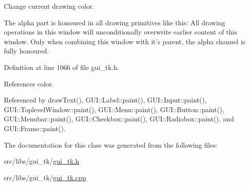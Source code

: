 Change current drawing color. 

The alpha part is honoured in all drawing primitives like this\-: All drawing operations in this window will unconditionally overwrite earlier content of this window. Only when combining this window with it's parent, the alpha channel is fully honoured. 

Definition at line 1066 of file gui\-\_\-tk.\-h.



References color.



Referenced by draw\-Text(), G\-U\-I\-::\-Label\-::paint(), G\-U\-I\-::\-Input\-::paint(), G\-U\-I\-::\-Toplevel\-Window\-::paint(), G\-U\-I\-::\-Menu\-::paint(), G\-U\-I\-::\-Button\-::paint(), G\-U\-I\-::\-Menubar\-::paint(), G\-U\-I\-::\-Checkbox\-::paint(), G\-U\-I\-::\-Radiobox\-::paint(), and G\-U\-I\-::\-Frame\-::paint().



The documentation for this class was generated from the following files\-:\begin{DoxyCompactItemize}
\item 
src/libs/gui\-\_\-tk/\hyperlink{gui__tk_8h}{gui\-\_\-tk.\-h}\item 
src/libs/gui\-\_\-tk/\hyperlink{gui__tk_8cpp}{gui\-\_\-tk.\-cpp}\end{DoxyCompactItemize}
